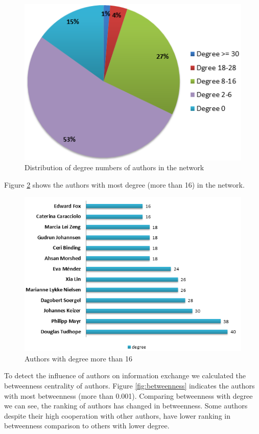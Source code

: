 \documentclass[runningheads,a4paper]{llncs}
\begin{document}
\begin{figure}[H]
	\centering
	\includegraphics[width=0.6\linewidth]{degreePercentage}
	\caption{Distribution of degree numbers of authors in the network} 
	\label{fig:degreePercentage}
\end{figure}

Figure \ref{fig:degree16} shows the authors with most degree (more than 16) in the network. 

\begin{figure}[H]
	\centering
	\includegraphics[width=0.8\linewidth]{degree16}
	\caption{Authors with degree more than 16}
	\label{fig:degree16}
\end{figure}


To detect the influence of authors on information exchange we calculated the betweenness centrality of authors. Figure \ref{fig:betweenness} indicates the authors with most betweenness (more than 0.001). Comparing betweenness with degree we can see, the ranking of authors has changed in betweenness. Some authors despite their high cooperation with other authors, have lower ranking in betweenness comparison to others with lower degree. 
\end{document}
